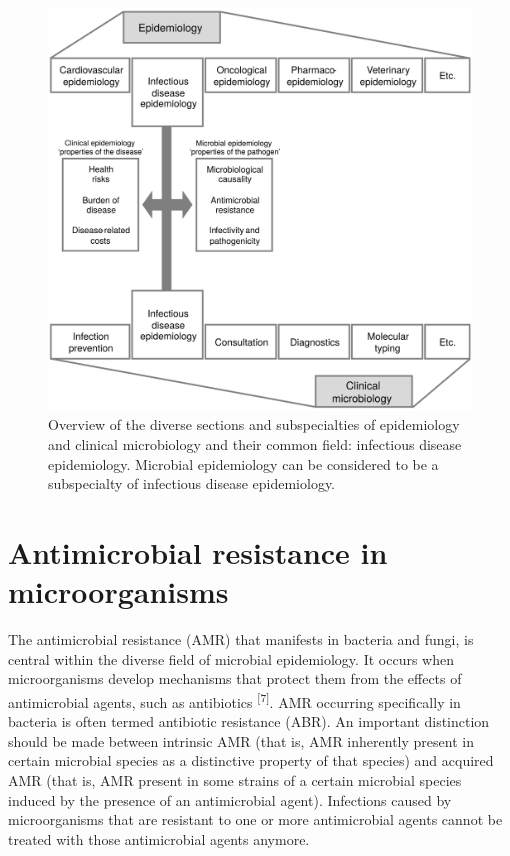 \documentclass[
]{book}
\begin{document}
\begin{figure}

{\centering \includegraphics[width=1\linewidth]{images/01-02} 

}

\caption{Overview of the diverse sections and subspecialties of epidemiology and clinical microbiology and their common field: infectious disease epidemiology. Microbial epidemiology can be considered to be a subspecialty of infectious disease epidemiology.}\label{fig:intro-2}
\end{figure}

\hypertarget{antimicrobial-resistance-in-microorganisms}{%
\section{Antimicrobial resistance in microorganisms}\label{antimicrobial-resistance-in-microorganisms}}

The antimicrobial resistance (AMR) that manifests in bacteria and fungi, is central within the diverse field of microbial epidemiology. It occurs when microorganisms develop mechanisms that protect them from the effects of antimicrobial agents, such as antibiotics \textsuperscript{{[}7{]}}. AMR occurring specifically in bacteria is often termed antibiotic resistance (ABR). An important distinction should be made between intrinsic AMR (that is, AMR inherently present in certain microbial species as a distinctive property of that species) and acquired AMR (that is, AMR present in some strains of a certain microbial species induced by the presence of an antimicrobial agent). Infections caused by microorganisms that are resistant to one or more antimicrobial agents cannot be treated with those antimicrobial agents anymore.
\end{document}
